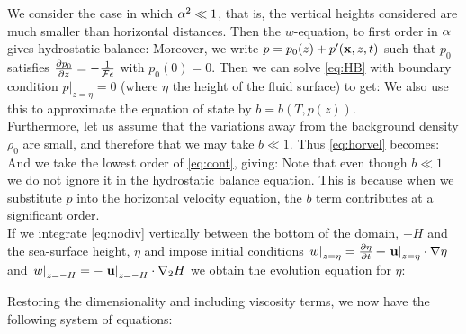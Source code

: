 We consider the case in which $\alpha^{2}\ll 1$, that is, the vertical heights considered are much smaller than horizontal distances. Then the $w$-equation, to first order in $\alpha$ gives hydrostatic balance:
Moreover, we write $p = p_{0}(z) + p'(\mathbf{x},z,t)$ such that $p_{0}$ satisfies $\frac{\partial p_{0}}{\partial z} = -\frac{1}{\mathcal{F}\epsilon}$ with $p_{0}(0) = 0$. Then we can solve \cref{eq:HB} with boundary condition $\left. p\right|_{z=\eta}= 0$ (where $\eta$ the height of the fluid surface) to get:
We also use this to approximate the equation of state by $b=b(T,p(z))$. \\
\linebreak
Furthermore, let us assume that the variations away from the background density $\rho_{0}$ are small, and therefore that we may take $b\ll 1$. Thus \cref{eq:horvel} becomes:
And we take the lowest order of \cref{eq:cont}, giving:
Note that even though $b\ll 1$ we do not ignore it in the hydrostatic balance equation. This is because when we substitute $p$ into the horizontal velocity equation, the $b$ term contributes at a significant order. \\
\linebreak
If we integrate \cref{eq:nodiv} vertically between the bottom of the domain, $-H$ and the sea-surface height, $\eta$ and impose initial conditions $\left. w\right|_{z=\eta} = \frac{\partial \eta}{\partial t} + \left. \mathbf{u}\right|_{z=\eta}\cdot\nabla\eta$ and $\left. w\right|_{z=-H} = -\left.\mathbf{u}\right|_{z=-H}\cdot\nabla_{2}H$ we obtain the evolution equation for $\eta$:
\iffalse
Now, if we combine \cref{eq:cont} with the equation of state $b = b(T,p)$ we find:
\eqnn{
	\PD{b}{T}\DD{T}{t} + \PD{b}{p}\DD{p}{t} + (1+b)\lrb{\nabla_{2}\cdot\B{u} + \PD{w}{z}} = 0
}
where $\DD{}{t} := \B{u}\cdot\nabla_{2} + w\PD{}{z}$. To eliminate acoustic modes (see \cite{adcroft_2004}) we take the speed of sound $c_{s} = 1/\sqrt{\PD{b}{p}} \arr \infty$, and this removes the second term in the above equation. Equivalently we use the equation of state $b = b(T,z)$.
\fi
Restoring the dimensionality and including viscosity terms, we now have the following system of equations:
